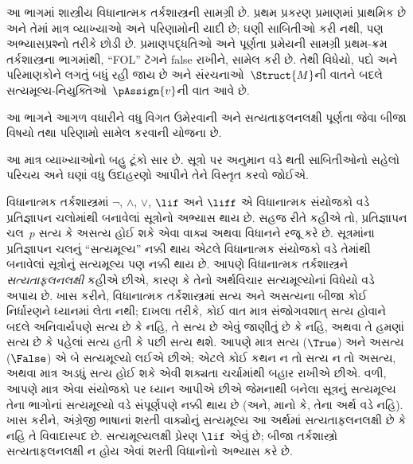 
\label{guunit:OLP-0055}


\begin{editorial}
  આ ભાગમાં શાસ્ત્રીય વિધાનાત્મક તર્કશાસ્ત્રની સામગ્રી છે. પ્રથમ પ્રકરણ
  પ્રમાણમાં પ્રાથમિક છે અને તેમાં માત્ર વ્યાખ્યાઓ અને પરિણામોની યાદી છે;
  ઘણી સાબિતીઓ કરી નથી, પણ અભ્યાસપ્રશ્નો તરીકે છોડી છે. પ્રમાણપદ્ધતિઓ
  અને પૂર્ણતા પ્રમેયની સામગ્રી પ્રથમ-ક્રમ તર્કશાસ્ત્રના ભાગમાંથી,
  ``FOL'' ટૅગને false રાખીને, સામેલ કરી છે. તેથી વિધેયો, પદો અને
  પરિમાણકોને લગતું બધું રહી જાય છે અને સંરચનાઓ~$\Struct{M}$ની
  વાતને બદલે સત્યમૂલ્ય-નિયુક્તિઓ~$\pAssign{v}$ની વાત આવે છે.

  આ ભાગને આગળ વધારીને વધુ વિગત ઉમેરવાની અને સત્યતાફલનલક્ષી પૂર્ણતા
  જેવા બીજા વિષયો તથા પરિણામો સામેલ કરવાની યોજના છે.
\end{editorial}

\begingroup
\makeatletter{}\makeatother

\label{guunit:OLP-0056}


\begin{editorial}
  આ માત્ર વ્યાખ્યાઓનો બહુ ટૂંકો સાર છે. સૂત્રો પર અનુમાન વડે થતી
  સાબિતીઓનો સહેલો પરિચય અને ઘણાં વધુ ઉદાહરણો આપીને તેને વિસ્તૃત
  કરવો જોઈએ.
\end{editorial}

\begingroup
\makeatletter{}\makeatother


\label{guunit:OLP-0057}


વિધાનાત્મક તર્કશાસ્ત્રમાં $\lnot$, $\land$, $\lor$, $\lif$ અને
$\liff$ એ વિધાનાત્મક સંયોજકો વડે પ્રતિજ્ઞાપન ચલોમાંથી
બનાવેલાં સૂત્રોનો અભ્યાસ થાય છે. સહજ રીતે કહીએ તો,
પ્રતિજ્ઞાપન ચલ~$p$ સત્ય કે અસત્ય હોઈ શકે એવા વાક્ય
અથવા વિધાનને રજૂ કરે છે. સૂત્રમાંના પ્રતિજ્ઞાપન ચલનું
``સત્યમૂલ્ય'' નક્કી થાય એટલે વિધાનાત્મક સંયોજકો વડે તેમાંથી બનાવેલાં
સૂત્રોનું સત્યમૂલ્ય પણ નક્કી થાય છે. આપણે
વિધાનાત્મક તર્કશાસ્ત્રને \emph{સત્યતાફલનલક્ષી} કહીએ છીએ, કારણ કે તેનો
અર્થવિચાર સત્યમૂલ્યોનાં વિધેયો વડે અપાય છે. ખાસ કરીને, વિધાનાત્મક
તર્કશાસ્ત્રમાં સત્ય અને અસત્યના બીજા કોઈ નિર્ધારણને ધ્યાનમાં લેતા નથી;
દાખલા તરીકે, કોઈ વાત માત્ર સંજોગવશાત્ સત્ય હોવાને બદલે અનિવાર્યપણે
સત્ય છે કે નહિ, તે સત્ય છે એવું જાણીતું છે કે નહિ, અથવા તે હમણાં
સત્ય છે કે પહેલાં સત્ય હતી કે પછી સત્ય થશે. આપણે માત્ર સત્ય
($\True$) અને અસત્ય ($\False$) એ બે સત્યમૂલ્યો લઈએ છીએ; એટલે કોઈ
કથન ન તો સત્ય ન તો અસત્ય, અથવા માત્ર અડધું સત્ય હોઈ શકે એવી શક્યતા
ચર્ચામાંથી બહાર રાખીએ છીએ. વળી, આપણે માત્ર એવા સંયોજકો પર ધ્યાન
આપીએ છીએ જેમનાથી બનેલા સૂત્રનું સત્યમૂલ્ય તેના ભાગોનાં
સત્યમૂલ્યો વડે સંપૂર્ણપણે નક્કી થાય છે (અને, માનો કે, તેના અર્થ વડે
નહિ). ખાસ કરીને, અંગ્રેજી ભાષાનાં શરતી વાક્યોનું સત્યમૂલ્ય આ અર્થમાં
સત્યતાફલનલક્ષી છે કે નહિ તે વિવાદાસ્પદ છે. સત્યમૂલ્યલક્ષી પ્રેરણ
$\lif$ એવું છે; બીજા તર્કશાસ્ત્રો સત્યતાફલનલક્ષી ન હોય એવાં શરતી
વિધાનોનો અભ્યાસ કરે છે.

